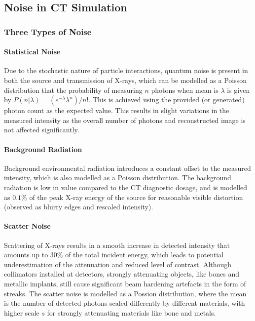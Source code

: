 \documentclass[10pt,twocolumn]{article}
\begin{document}
\subsection{Noise in CT Simulation}
\subsubsection{Three Types of Noise}
\paragraph{Statistical Noise}
Due to the stochastic nature of particle interactions, quantum noise is present in both the source and transmission of X-rays, which can be modelled as a Poisson distribution that the probability of measuring $n$ photons when mean is $\lambda$ is given by $P(n|\lambda)=(e^{-\lambda}\lambda^n)/n!$\cite{Suetens_2009}. This is achieved using the provided (or generated) photon count as the expected value.
This results in slight variations in the measured intensity as the overall number of photons and reconstructed image is not affected significantly.

\paragraph{Background Radiation}
Background environmental radiation introduces a constant offset to the measured intensity, which is also modelled as a Poisson distribution. The background radiation is low in value compared to the CT diagnostic dosage, and is modelled as $0.1\%$ of the peak X-ray energy of the source for reasonable visible distortion (observed as blurry edges and rescaled intensity).

\paragraph{Scatter Noise}
Scattering of X-rays results in a smooth increase in detected intensity that amounts up to $30\%$ of the total incident energy, which leads to potential underestimation of the attenuation and reduced level of contrast\cite{Suetens_2009}. 
Although collimators installed at detectors, strongly attenuating objects, like bones and metallic implants, still cause significant beam hardening artefacts in the form of streaks\cite{https://doi.org/10.1118/1.4709599}. 
The scatter noise is modelled as a Possion distribution, where the mean is the number of detected photons scaled differently by different materials, with higher scale $s$ for strongly attenuating materials like bone and metals. 
\end{document}
